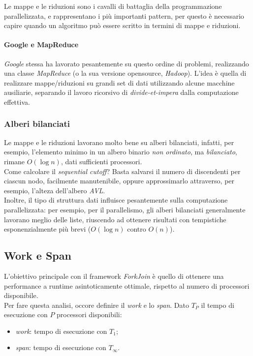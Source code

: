 Le mappe e le riduzioni sono i cavalli di battaglia della programmazione parallelizzata, e rappresentano i più importanti pattern, per questo è necessario capire quando un algoritmo può essere scritto in termini di mappe e riduzioni.

\paragraph{Google e MapReduce}
\textit{Google} stessa ha lavorato pesantemente su questo ordine di problemi, realizzando una classe \textit{MapReduce} (o la sua versione opensource, \textit{Hadoop}). L'idea è quella di realizzare mappe/riduzioni su grandi set di dati utilizzando alcune macchine ausiliarie, separando il lavoro ricorsivo di \textit{divide-et-impera} dalla computazione effettiva.

\subsubsection{Alberi bilanciati}
Le mappe e le riduzioni lavorano molto bene su alberi bilanciati, infatti, per esempio, l'elemento minimo in un albero binario \textit{non ordinato}, ma \textit{bilanciato}, rimane $O(\log{n})$, dati sufficienti processori. \\
Come calcolare il \textit{sequential cutoff}? Basta salvarsi il numero di discendenti per ciascun nodo, facilmente manutenibile, oppure approssimarlo attraverso, per esempio, l'alteza dell'albero \textit{AVL}. \\
Inoltre, il tipo di struttura dati influisce pesantemente sulla computazione parallelizzata: per esempio, per il parallelismo, gli alberi bilanciati generalmente lavorano meglio delle liste, riuscendo ad ottenere risultati con tempistiche esponenzialmente più brevi ($O(\log{n})$ contro $O(n)$).

\subsection{Work e Span}
L'obiettivo principale con il framework \textit{ForkJoin} è  quello di ottenere una performance a runtime asintoticamente ottimale, rispetto al numero di processori disponibile. \\
Per fare questa analisi, occore definire il \textit{work} e lo \textit{span}. Dato $T_{P}$ il tempo di esecuzione con $P$ processori disponibili:
\begin{itemize}
	\item \textit{work}: tempo di esecuzione con $T_{1}$;
	\item \textit{span}: tempo di esecuzione con $T_{\infty}$.
\end{itemize}

